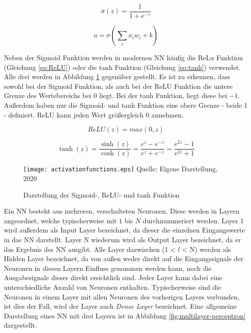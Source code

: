 \begin{equation} \label{eq:sigmoid}
    \sigma (z) =  \frac{1}{1+e^{-z}}
\end{equation}

\begin{equation} \label{eq:outputNeuron}
    a = \sigma (\sum_{i}{x_i w_i + b})
\end{equation}

Neben der Sigmoid Funktion werden in modernen \ac{NN} häufig die ReLu Funktion (Gleichung \ref{eq:ReLU}) oder die tanh Funktion (Gleichung \ref{eq:tanh}) verwendet. Alle drei werden in Abbildung \ref{fig:activationfunctions} gegenüber gestellt. Es ist zu erkennen, dass sowohl bei der Sigmoid Funktion, als auch bei der ReLU Funktion die untere Grenze des Wertebereichs bei $0$ liegt. Bei der tanh Funktion, liegt diese bei $-1$. Außerdem haben nur die Sigmoid- und tanh Funktion eine obere Grenze - beide 1 - definiert. ReLU kann jeden Wert größergleich $0$ annehmen.

\begin{equation} \label{eq:ReLU}
    ReLU(z) = max(0,z)
\end{equation}

\begin{equation} \label{eq:tanh}
    \tanh(z) = \frac{\sinh(z)}{\cosh(z)} = \frac {e^z - e^{-z}} {e^z + e^{-z}}
  = \frac{e^{2z} - 1} {e^{2z} + 1}
\end{equation}

\begin{figure}[t]
    \centering
    \caption[]{Darstellung der Sigmoid-, ReLU- und tanh Funktion}
	\label{fig:activationfunctions}
    \texttt{[image: activationfunctions.eps]}
    Quelle: Eigene Darstellung, 2020
\end{figure}

Ein \ac{NN} besteht aus mehreren, verschalteten Neuronen. Diese werden in Layern angeordnet, welche typischerweise mit $1$ bis $N$ durchnummeriert werden. Layer 1 wird außerdem als Input Layer bezeichnet, da dieser die einzelnen Eingangswerte in das \ac{NN} darstellt. Layer N wiederum wird als Output Layer bezeichnet, da er das Ergebnis des \ac{NN} ausgibt. Alle Layer dazwischen (1 < $l$ < N) werden als Hidden Layer bezeichnet, da von außen weder direkt auf die Eingangssignale der Neuronen in diesen Layern Einfluss genommen werden kann, noch die Ausgabesignale dieser direkt ersichtlich sind. Jeder Layer kann dabei eine unterschiedliche Anzahl von Neuronen enthalten. Typischerweise sind die Neuronen in einem Layer mit allen Neuronen des vorherigen Layers verbunden, ist dies der Fall, wird der Layer auch \textit{Dense Layer} bezeichnet. Eine allgemeine Darstellung eines \ac{NN} mit drei Layern ist in Abbildung \ref{fig:multilayer-perceptron} dargestellt.

